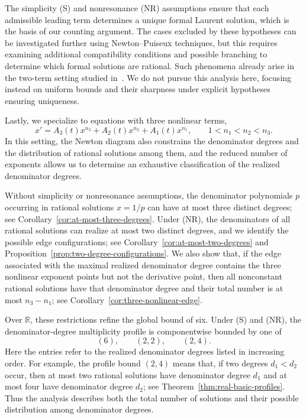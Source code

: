 \documentclass[12pt,a4paper]{amsart}
\numberwithin{theorem}{section}
\theoremstyle{definition}
\begin{document}
	The simplicity {\rm (S)} and nonresonance {\rm (NR)} assumptions ensure that each admissible leading term determines a unique formal Laurent solution, which is the basis of our counting argument. The cases excluded by these hypotheses can be investigated further using Newton--Puiseux techniques, but this requires examining additional compatibility conditions and possible branching to determine which formal solutions are rational. Such phenomena already arise in the two-term setting studied in~\cite{DuZhao2026}. We do not pursue this analysis here, focusing instead on uniform bounds and their sharpness under explicit hypotheses ensuring uniqueness.
	
	Lastly, we specialize to equations with three nonlinear terms,
	\[
	x'=A_3(t)x^{n_3}+A_2(t)x^{n_2}+A_1(t)x^{n_1},
	\qquad 1<n_1<n_2<n_3.
	\]
	In this setting, the Newton diagram also constrains the denominator degrees and the distribution of rational solutions among them, and the reduced number of exponents allows us to determine an exhaustive classification of the realized denominator degrees.
	
	Without simplicity or nonresonance assumptions, the denominator polynomials $p$ occurring in rational solutions $x=1/p$ can have at most three distinct degrees; see Corollary~\ref{cor:at-most-three-degrees}. Under {\rm (NR)}, the denominators of all rational solutions can realize at most two distinct degrees, and we identify the possible edge configurations; see Corollary~\ref{cor:at-most-two-degrees} and Proposition~\ref{prop:two-degree-configurations}. We also show that, if the edge associated with the maximal realized denominator degree contains the three nonlinear exponent points but not the derivative point, then all nonconstant rational solutions have that denominator degree and their total number is at most $n_3-n_1$; see Corollary~\ref{cor:three-nonlinear-edge}.
	
	Over $\mathbb{R}$, these restrictions refine the global bound of six. Under {\rm (S)} and {\rm (NR)}, the denominator-degree multiplicity profile is componentwise bounded by one of
	\[
	(6),\qquad (2,2),\qquad (2,4).
	\]
	Here the entries refer to the realized denominator degrees listed in increasing order. For example, the profile bound $(2,4)$ means that, if two degrees $d_1<d_2$ occur, then at most two rational solutions have denominator degree $d_1$ and at most four have denominator degree $d_2$; see Theorem~\ref{thm:real-basic-profiles}. Thus the analysis describes both the total number of solutions and their possible distribution among denominator degrees.
	
\end{document}
